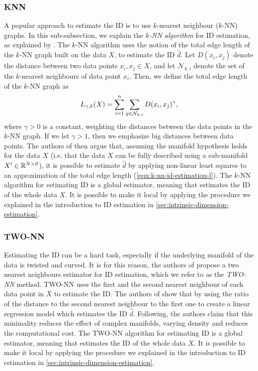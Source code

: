 \subsubsection{KNN}
\label{sec:id-estimation-knn}
A popular approach to estimate the ID is to use $k$-nearest neighbour ($k$-NN) graphs. In this sub-subsection, we explain the \textit{$k$-NN algorithm} for ID estimation, as explained by \cite[p. 651]{Carter2010}. The $k$-NN algorithm uses the notion of the total edge length of the $k$-NN graph built on the data $X$, to estimate the ID $\hat{d}$. Let $D(x_i, x_j)$ denote the distance between two data points $x_i, x_j \in X$, and let $\mathcal{N}_{k, i}$ denote the set of the $k$-nearest neighbours of data point $x_i$. Then, we define the total edge length of the $k$-NN graph as
\begin{align}
    L_{\gamma, k}(X) = \sum\limits_{i=1}^{n} \sum\limits_{y \in \mathcal{N}_{k, i}}^{} D(x_i, x_j)^\gamma,
    \label{eqn:k-nn-id-estimation-l}
\end{align}
where $\gamma>0$ is a constant, weighting the distances between the data points in the $k$-NN graph. If we let $\gamma>1$, then we emphasize big distances between data points. The authors of \cite[p. 651]{Carter2010} then argue that, assuming the manifold hypothesis holds for the data $X$ (i.e. that the data $X$ can be fully described using a sub-manifold $X' \in \mathbb{R}^{N \times d}$), it is possible to estimate $\hat{d}$ by applying non-linear least squares to an approximation of the total edge length (\cref{eqn:k-nn-id-estimation-l}). The $k$-NN algorithm for estimating ID is a global estimator, meaning that estimates the ID of the whole data $X$. It is possible to make it local by applying the procedure we explained in the introduction to ID estimation in \cref{sec:intrinsic-dimension-estimation}.

\subsubsection{TWO-NN}
\label{sec:id-estimation-twonn}
Estimating the ID can be a hard task, especially if the underlying manifold of the data is twisted and curved. It is for this reason, the authors of \cite{Facco2017twonn} propose a two nearest neighbours estimator for ID estimation, which we refer to as the \textit{TWO-NN} method. TWO-NN uses the first and the second nearest neighbour of each data point in $X$ to estimate the ID. The authors of \cite{Facco2017twonn} show that by using the ratio of the distance to the second nearest neighbour to the first one to create a linear regression model which estimates the ID $\hat{d}$. Following, the authors claim that this minimality reduces the effect of complex manifolds, varying density and reduces the computational cost. The TWO-NN algorithm for estimating ID is a global estimator, meaning that estimates the ID of the whole data $X$. It is possible to make it local by applying the procedure we explained in the introduction to ID estimation in \cref{sec:intrinsic-dimension-estimation}.

